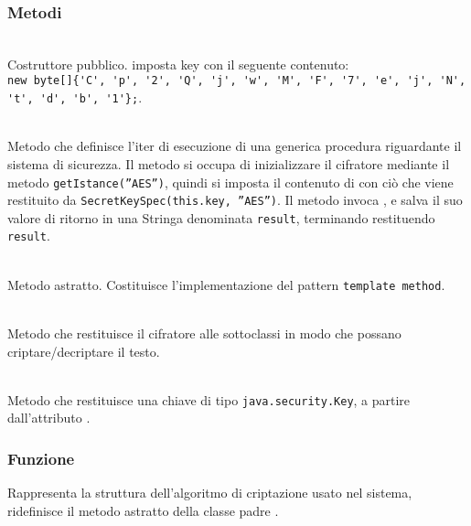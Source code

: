 \subsubsection*{Metodi}
\begin{description}

	\item{}\\
	Costruttore pubblico. imposta key con il seguente contenuto:\\
	\verb|new byte[]{'C', 'p', '2', 'Q', 'j', 'w', 'M', 'F', '7', 'e', 'j', 'N', 't', 'd', 'b', '1'};|.

	\item{}\\
	Metodo che definisce l'iter di esecuzione di una generica procedura riguardante il sistema di sicurezza. Il metodo si occupa di inizializzare il cifratore  mediante il metodo \texttt{getIstance(''AES'')}, quindi si imposta il contenuto di  con ciò che viene restituito da \texttt{SecretKeySpec(this.key, ''AES'')}. Il metodo invoca , e salva il suo valore di ritorno in una Stringa denominata \texttt{result}, terminando restituendo \texttt{result}.

	\item{}\\
	Metodo astratto. Costituisce l'implementazione del pattern \texttt{template method}.

	\item{}\\
	Metodo che restituisce il cifratore  alle sottoclassi in modo che possano criptare/decriptare il testo.

	\item{}\\
	Metodo che restituisce una chiave di tipo \texttt{java.security.Key}, a partire dall'attributo .
	
\end{description}


\subsubsection*{Funzione}
Rappresenta la struttura dell'algoritmo di criptazione usato nel sistema, ridefinisce il metodo astratto  della classe padre .

